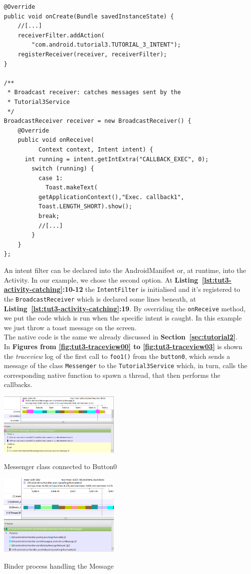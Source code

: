 \documentclass[a4paper,10pt]{article}
\makeatletter
\newenvironment{figurehere}{\def\@captype{figure}\vspace{2ex}}{\vspace{2ex}}
\newcommand{\keyword}[1]{\texttt{#1}}
\newcommand{\refl}[1]{\textbf{Listing~\ref{#1}}}
\newcommand{\refs}[1]{\textbf{Section~\ref{#1}}}
\makeatother
\begin{document}
\begin{multicols}{2}
\begin{lstlisting}
@Override
public void onCreate(Bundle savedInstanceState) {
	//[...]
	receiverFilter.addAction(
		"com.android.tutorial3.TUTORIAL_3_INTENT");
	registerReceiver(receiver, receiverFilter);
}

/**
 * Broadcast receiver: catches messages sent by the
 * Tutorial3Service
 */
BroadcastReceiver receiver = new BroadcastReceiver() {
	@Override
	public void onReceive(
          Context context, Intent intent) {
	  int running = intent.getIntExtra("CALLBACK_EXEC", 0);
	    switch (running) {
	      case 1:
	        Toast.makeText(
		  getApplicationContext(),"Exec. callback1",
		  Toast.LENGTH_SHORT).show();
	      break;
	      //[...]
	    }
	}
};
\end{lstlisting}
An intent filter can be declared into the AndroidManifest or, at runtime, into
the Activity. In our example, we chose the second option. At
\refl{lst:tut3-activity-catching}\textbf{:10-12} the \keyword{IntentFilter} is
initialised and it's registered to the \keyword{BroadcastReceiver} which is
declared some lines beneath, at \refl{lst:tut3-activity-catching}\textbf{:19}.
By overriding the \keyword{onReceive} method, we put the code which is run when
the specific intent is caught. In this example we just throw a toast message on
the screen.\\
The native code is the same we already discussed in \refs{sec:tutorial2}.\\
In \textbf{Figures from \ref{fig:tut3-traceview00} to
\ref{fig:tut3-traceview03}} is shown the \textit{traceview} log of the first
call to \keyword{foo1()} from the \keyword{button0}, which sends a message of
the class \keyword{Messenger} to the \keyword{Tutorial3Service} which, in turn,
calls the corresponding native function to spawn a thread, that then performs
the callbacks.

\begin{figurehere}
 \centering
 \includegraphics[width=6cm]{./figures/traceview00.png}
 \caption{Messenger class connected to Button0}
 \label{fig:tut3-traceview00}
\end{figurehere}

\begin{figurehere}
 \centering
 \includegraphics[width=6cm]{./figures/traceview01.png}
 \caption{Binder process handling the Message}
 \label{fig:tut3-traceview01}
\end{figurehere}


\end{multicols}
\end{document}
